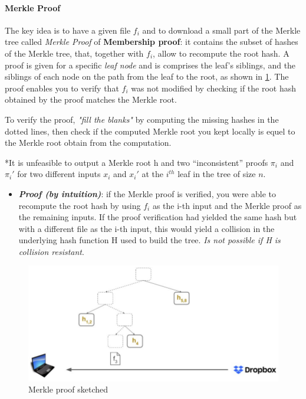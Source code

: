 \documentclass[10pt,a4paper]{report}
\begin{document}
\paragraph{Merkle Proof}\label{sec:merkle-proof}
The key idea is to have a given file $f_{i}$ and to download a small part of the Merkle tree called \textit{Merkle Proof} of \textbf{Membership proof}: it contains the subset of hashes of the Merkle tree, that, together with $f_{i}$, allow to recompute the root hash. A proof is given for a specific \textit{leaf node} and is comprises the leaf's siblings, and the siblings of each node on the path from the leaf to the root, as shown in \ref{merkle-proof}.
The proof enables you to verify that $f_{i}$ was not modified by checking if the root hash obtained by the proof matches the Merkle root.


To verify the proof, \textit{"fill the blanks"} by computing the missing hashes in the dotted lines, then check if the computed Merkle root you kept locally is equel to the Merkle root obtain from the computation.

*It is unfeasible to output a Merkle root h and two “inconsistent” proofs $\pi_{i}$ and $\pi_{i}'$ for two different inputs $x_{i}$ and $x_{i}'$ at the $i^{th}$ leaf in the tree of size $n$.
\begin{itemize}
	\item 
	\textit{\textbf{Proof (by intuition)}}:
	if the Merkle proof is verified, you were able to recompute the root hash by using $f_{i}$ as the i-th input and the Merkle proof as the remaining inputs. If the proof verification had yielded the same hash but with a different file  as the i-th input, this would yield a collision in the underlying hash function H used to build the tree. \textit{Is not possible if H is collision resistant}.
\end{itemize}

\begin{figure}[b!]
	\includegraphics[scale=0.50]{images/Pasted image 20230317165901.png}
	\caption{Merkle proof sketched}
	\label{merkle-proof}
\end{figure}
\clearpage
\end{document}
